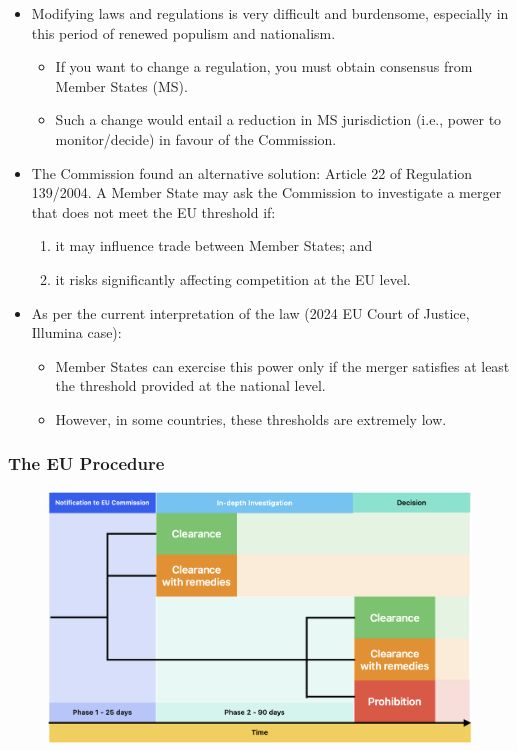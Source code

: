         \begin{itemize}
            \item Modifying laws and regulations is very difficult and burdensome, especially in this period of renewed populism and nationalism.
            \begin{itemize}
                \item If you want to change a regulation, you must obtain consensus from Member States (MS).
                \item Such a change would entail a reduction in MS jurisdiction (i.e., power to monitor/decide) in favour of the Commission.
            \end{itemize}
        
            \item The Commission found an alternative solution: Article 22 of Regulation 139/2004. A Member State may ask the Commission to investigate a merger that does not meet the EU threshold if:
            \begin{enumerate}
                \item it may influence trade between Member States; and
                \item it risks significantly affecting competition at the EU level.
            \end{enumerate}
            
            \item As per the current interpretation of the law (2024 EU Court of Justice, Illumina case):
            \begin{itemize}
                \item Member States can exercise this power only if the merger satisfies at least the threshold provided at the national level.
                \item However, in some countries, these thresholds are extremely low.
            \end{itemize}
        \end{itemize}

        \subsubsection*{The EU Procedure}

            \begin{figure}[ht]
                \centering
                \includegraphics[width=1\linewidth]{graphics/L13-1.png}
            \end{figure}


